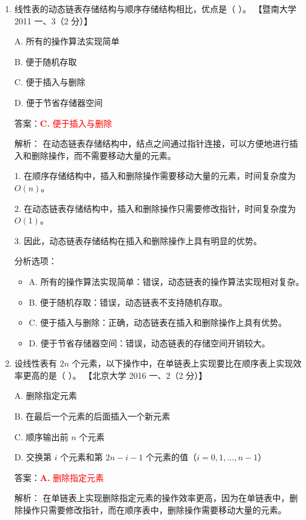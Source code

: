 \documentclass[lang=cn,newtx,10pt,scheme=chinese]{../../../elegantbook}
\begin{document}
\begin{enumerate}
        \item 线性表的动态链表存储结构与顺序存储结构相比，优点是（ ）。  
        【暨南大学 2011 一、3（2 分）】  
    
        A. 所有的操作算法实现简单  
    
        B. 便于随机存取  
    
        C. 便于插入与删除  
    
        D. 便于节省存储器空间  
        
        答案：\textcolor{red}{\textbf{C.} 便于插入与删除}

        解析：
        在动态链表存储结构中，结点之间通过指针连接，可以方便地进行插入和删除操作，而不需要移动大量的元素。

        1. 在顺序存储结构中，插入和删除操作需要移动大量的元素，时间复杂度为 $O(n)$。

        2. 在动态链表存储结构中，插入和删除操作只需要修改指针，时间复杂度为 $O(1)$。

        3. 因此，动态链表存储结构在插入和删除操作上具有明显的优势。

        分析选项：
        \begin{itemize}
            \item A. 所有的操作算法实现简单：错误，动态链表的操作算法实现相对复杂。
            \item B. 便于随机存取：错误，动态链表不支持随机存取。
            \item C. 便于插入与删除：正确，动态链表在插入和删除操作上具有优势。
            \item D. 便于节省存储器空间：错误，动态链表的存储空间开销较大。
        \end{itemize}
        \item 设线性表有 $2n$ 个元素，以下操作中，在单链表上实现要比在顺序表上实现效率更高的是（ ）。  
        【北京大学 2016 一、2（2 分）】  
    
        A. 删除指定元素  
    
        B. 在最后一个元素的后面插入一个新元素  
    
        C. 顺序输出前 $n$ 个元素  
    
        D. 交换第 $i$ 个元素和第 $2n-i-1$ 个元素的值（$i=0, 1, \dots, n-1$）  

        答案：\textcolor{red}{\textbf{A.} 删除指定元素}

        解析：
        在单链表上实现删除指定元素的操作效率更高，因为在单链表中，删除操作只需要修改指针，而在顺序表中，删除操作需要移动大量的元素。


\end{enumerate}
\end{document}
